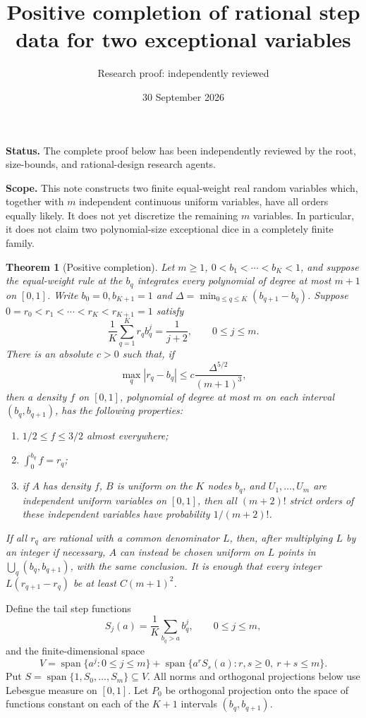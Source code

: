 \documentclass[11pt]{article}
\title{Positive completion of rational step data for two exceptional variables}
\author{Research proof: independently reviewed}
\date{30 September 2026}
\newtheorem{theorem}{Theorem}
\begin{document}
\maketitle
\noindent\textbf{Status.} The complete proof below has been independently
reviewed by the root, size-bounds, and rational-design research agents.
\medskip

\noindent\textbf{Scope.} This note constructs two finite equal-weight real
random variables which, together with $m$ independent continuous uniform
variables, have all orders equally likely. It does not yet discretize the
remaining $m$ variables. In particular, it does not claim two polynomial-size
exceptional dice in a completely finite family.

\begin{theorem}[Positive completion]\label{completion}
Let $m\ge1$, $0<b_1<\cdots<b_K<1$, and suppose the equal-weight rule at
the $b_q$ integrates every polynomial of degree at most $m+1$ on $[0,1]$.
Write $b_0=0,b_{K+1}=1$ and
$\Delta=\min_{0\le q\le K}(b_{q+1}-b_q)$.
Suppose $0=r_0<r_1<\cdots<r_K<r_{K+1}=1$ satisfy
\begin{equation}\label{step}
 \frac1K\sum_{q=1}^K r_q b_q^j=\frac1{j+2},\qquad 0\le j\le m.
\end{equation}
There is an absolute $c>0$ such that, if
\begin{equation}\label{close}
 \max_q|r_q-b_q|\le c\frac{\Delta^{5/2}}{(m+1)^3},
\end{equation}
then a density $f$ on $[0,1]$, polynomial of degree at most $m$ on each
interval $(b_q,b_{q+1})$, has the following properties:
\begin{enumerate}
\item $1/2\le f\le3/2$ almost everywhere;
\item $\int_0^{b_q}f=r_q$;
\item if $A$ has density $f$, $B$ is uniform on the $K$ nodes $b_q$, and
$U_1,\ldots,U_m$ are independent uniform variables on $[0,1]$, then all
$(m+2)!$ strict orders of these independent variables have probability
$1/(m+2)!$.
\end{enumerate}
If all $r_q$ are rational with a common denominator $L$, then, after
multiplying $L$ by an integer if necessary, $A$ can instead be chosen
uniform on $L$ points in $\bigcup_q(b_q,b_{q+1})$, with the same conclusion.
It is enough that every integer $L(r_{q+1}-r_q)$ be at least $C(m+1)^2$.
\end{theorem}

Define the tail step functions
\[
 S_j(a)=\frac1K\sum_{b_q>a}b_q^j,\qquad 0\le j\le m,
\]
and the finite-dimensional space
\[
 V=\operatorname{span}\{a^j:0\le j\le m\}
   +\operatorname{span}\{a^rS_s(a):r,s\ge0,\ r+s\le m\}.
\]
Put $S=\operatorname{span}\{1,S_0,\ldots,S_m\}\subseteq V$.
All norms and orthogonal projections below use Lebesgue measure on $[0,1]$.
Let $P_0$ be orthogonal projection onto the space of functions constant
on each of the $K+1$ intervals $(b_q,b_{q+1})$.
\end{document}
